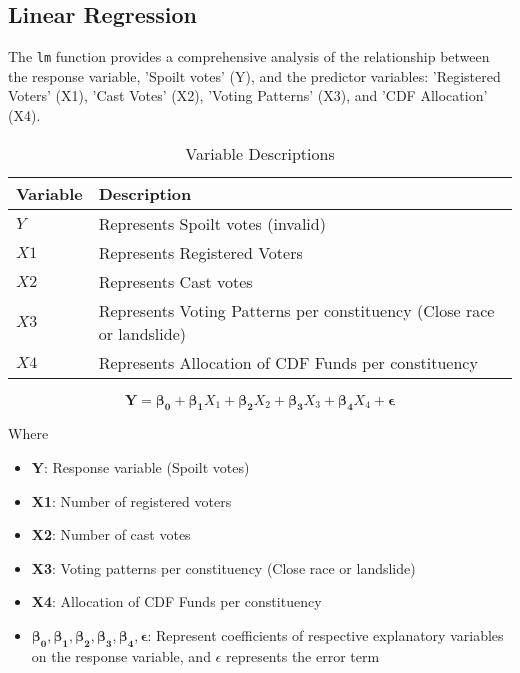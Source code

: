 \documentclass[fleqn,a4paper,12pt]{article}
\begin{document}
\subsection{Linear Regression}

The \texttt{lm} function provides a comprehensive analysis of the relationship between the response variable, 'Spoilt votes' (Y), and the predictor variables: 'Registered Voters' (X1), 'Cast Votes' (X2), 'Voting Patterns' (X3), and 'CDF Allocation' (X4).

\begin{table}[htb] %
  \centering
  \small
  \begin{tabular}{|p{}|p{}|}
    \hline
    \textbf{Variable} & \textbf{Description} \\
    \hline
    $Y$ & Represents Spoilt votes (invalid) \\
    \hline
    $X1$ & Represents Registered Voters \\
    \hline
    $X2$ & Represents Cast votes \\
    \hline
    $X3$ & Represents Voting Patterns per constituency (Close race or landslide) \\
    \hline
    $X4$ & Represents Allocation of CDF Funds per constituency \\
    \hline
  \end{tabular}
  \caption{Variable Descriptions}
\end{table}


\[
\bm{Y} = \bm{\beta_0} + \bm{\beta_1}X_1 + \bm{\beta_2}X_2 + \bm{\beta_3}X_3 + \bm{\beta_4}X_4 + \bm{\epsilon}
\]


Where

\begin{itemize}
  \item \textbf{Y}: Response variable (Spoilt votes)
  \item \textbf{X1}: Number of registered voters
  \item \textbf{X2}: Number of cast votes
  \item \textbf{X3}: Voting patterns per constituency (Close race or landslide)
  \item \textbf{X4}: Allocation of CDF Funds per constituency
  \item \textbf{$\bm{\beta_0},  \bm{\beta_1},  \bm{\beta_2},  \bm{\beta_3},  \bm{\beta_4}, \bm{\epsilon}$}: Represent coefficients of respective explanatory variables on the response variable, and $\epsilon$ represents the error term
\end{itemize}
\end{document}
